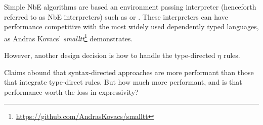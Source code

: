 Simple NbE algorithms are based an environment passing interpreter (henceforth referred to as NbE interpreters) such as \citet{Coquand1996} or \citet{Chapman2005}.
These interpreters can have performance competitive with the most widely used dependently typed languages, as Andras Kovacs' \textit{smalltt}\footnote{\url{https://github.com/AndrasKovacs/smalltt}} demonstrates.




However, another design decision is how to handle the type-directed $\eta$ rules.

Claims abound that syntax-directed approaches are more performant than those that integrate type-direct rules.
But how much more performant, and is that performance worth the loss in expressivity?

